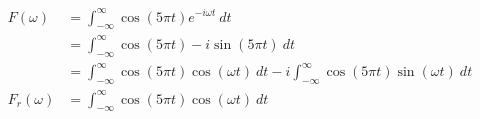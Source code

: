 \documentclass[preview]{standalone}
\begin{document}
\begin{align*}
F(\omega)&= \int_{-\infty}^{\infty} \cos{(5\pi t)}e^{-i\omega t} \ dt \\ &= \int_{-\infty}^{\infty} \cos{(5\pi t)}-i\sin{(5\pi t)} \ dt \\ &=\int_{-\infty}^{\infty} \cos{(5\pi t)}\cos{(\omega t)} \ dt - i\int_{-\infty}^{\infty} \cos{(5\pi t)}\sin{(\omega t)} \ dt \\  F_{r}(\omega)&=\int_{-\infty}^{\infty} \cos{(5\pi t)}\cos{(\omega t)} \ dt
\end{align*}
\end{document}
